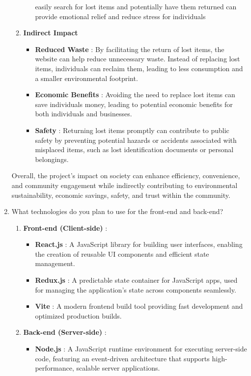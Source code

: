 \documentclass[14pt]{article}
\begin{document}
\begin{enumerate}
\begin{enumerate}
\begin{itemize}
easily search for lost items and potentially have them returned can provide emotional relief and reduce stress for individuals
\end{itemize}
\item \textbf{Indirect Impact}
\begin{itemize}
\item \textbf{Reduced Waste} : By facilitating the return of lost items, the website can
help reduce unnecessary waste. Instead of replacing lost items, individuals can reclaim them, leading to less consumption and a smaller environmental
footprint.
\item \textbf{Economic Benefits} : Avoiding the need to replace lost items can save
individuals money, leading to potential economic benefits for both
individuals and businesses.
\item \textbf{Safety} : Returning lost items promptly can contribute to public safety by
preventing potential hazards or accidents associated with misplaced items, such as lost identification documents or personal belongings.
\end{itemize}
\end{enumerate}
\tabto{.5cm} Overall, the project's impact on society can enhance efficiency, convenience, and
community engagement while indirectly contributing to environmental sustainability, economic savings, safety, and trust within the community.
\item What technologies do you plan to use for the front-end and back-end?
\begin{enumerate}
\item \textbf{Front-end (Client-side)} :
\begin{itemize}
\item \textbf{React.js} : A JavaScript library for building user interfaces, enabling the creation of reusable UI components and efficient state management.
\item \textbf{Redux.js} : A predictable state container for JavaScript apps, used for managing the application’s state across components seamlessly.
\item \textbf{Vite} : A modern frontend build tool providing fast development and optimized production builds.
\end{itemize}
\item \textbf{Back-end (Server-side)} :
\begin{itemize}
\item \textbf{Node.js} : A JavaScript runtime environment for executing server-side code, featuring an event-driven architecture that supports high-performance, scalable server applications.

\end{itemize}
\end{enumerate}
\end{enumerate}
\end{document}
